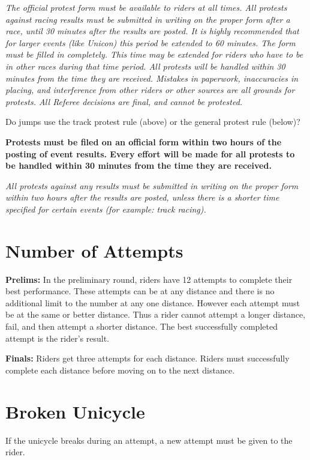 \textit{The official protest form must be available to riders at all times. All protests
against racing results must be submitted in writing on the proper form after a race,
until 30 minutes after the results are posted. It is highly recommended that for larger
events (like Unicon) this period be extended to 60 minutes. The form must be filled in
completely. This time may be extended for riders who have to be in other races during
that time period. All protests will be handled within 30 minutes from the time they are
received. Mistakes in paperwork, inaccuracies in placing, and interference from other
riders or other sources are all grounds for protests. All Referee decisions are final, and
cannot be protested.}

\begin{framed}
Do jumps use the track protest rule (above) or the general protest rule (below)?
\end{framed}

\textbf{Protests must be filed on an official form within two hours of the posting of event results. Every effort will be made for all protests to be handled within 30 minutes from the time they are received.}

\textit{All protests against any results must be submitted in writing on the proper form within two hours after the results are posted, unless there is a shorter time specified for certain events (for example: track racing).}

\section{Number of Attempts}

\textbf{Prelims:}
In the preliminary round, riders have 12 attempts to complete their best performance.
These attempts can be at any distance and there is no additional limit to the number at any one distance.
However each attempt must be at the same or better distance.
Thus a rider cannot attempt a longer distance, fail, and then attempt a shorter distance.
The best successfully completed attempt is the rider's result.

\textbf{Finals:}
Riders get three attempts for each distance.
Riders must successfully complete each distance before moving on to the next distance.

\section{Broken Unicycle}
If the unicycle breaks during an attempt, a new attempt must be given to the rider.

